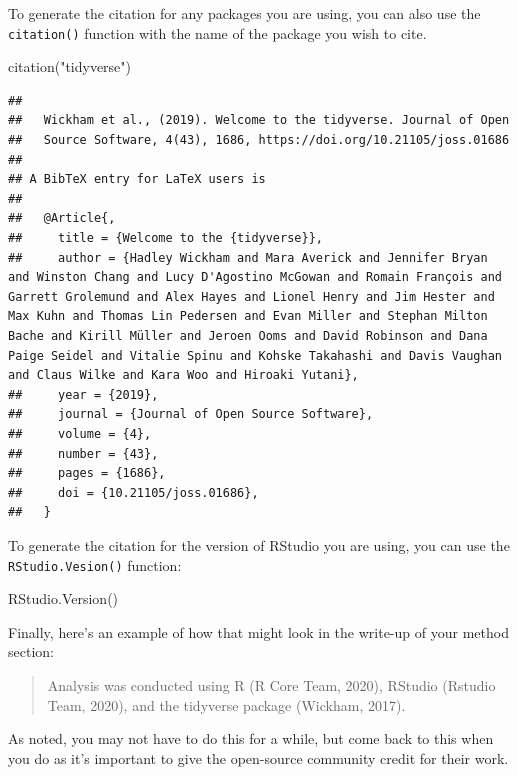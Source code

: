 \documentclass[
  oneside]{book}
\newenvironment{Shaded}{\begin{snugshade}}{\end{snugshade}}
\newcommand{\FunctionTok}[1]{\textcolor[rgb]{0.00,0.00,0.00}{#1}}
\newcommand{\NormalTok}[1]{#1}
\newcommand{\StringTok}[1]{\textcolor[rgb]{0.31,0.60,0.02}{#1}}
\begin{document}
To generate the citation for any packages you are using, you can also use the \texttt{citation()} function with the name of the package you wish to cite.

\begin{Shaded}
\begin{Highlighting}[]
\FunctionTok{citation}\NormalTok{(}\StringTok{"tidyverse"}\NormalTok{)}
\end{Highlighting}
\end{Shaded}

\begin{verbatim}
## 
##   Wickham et al., (2019). Welcome to the tidyverse. Journal of Open
##   Source Software, 4(43), 1686, https://doi.org/10.21105/joss.01686
## 
## A BibTeX entry for LaTeX users is
## 
##   @Article{,
##     title = {Welcome to the {tidyverse}},
##     author = {Hadley Wickham and Mara Averick and Jennifer Bryan and Winston Chang and Lucy D'Agostino McGowan and Romain François and Garrett Grolemund and Alex Hayes and Lionel Henry and Jim Hester and Max Kuhn and Thomas Lin Pedersen and Evan Miller and Stephan Milton Bache and Kirill Müller and Jeroen Ooms and David Robinson and Dana Paige Seidel and Vitalie Spinu and Kohske Takahashi and Davis Vaughan and Claus Wilke and Kara Woo and Hiroaki Yutani},
##     year = {2019},
##     journal = {Journal of Open Source Software},
##     volume = {4},
##     number = {43},
##     pages = {1686},
##     doi = {10.21105/joss.01686},
##   }
\end{verbatim}

To generate the citation for the version of RStudio you are using, you can use the \texttt{RStudio.Vesion()} function:

\begin{Shaded}
\begin{Highlighting}[]
\FunctionTok{RStudio.Version}\NormalTok{()}
\end{Highlighting}
\end{Shaded}

Finally, here's an example of how that might look in the write-up of your method section:

\begin{quote}
Analysis was conducted using R (R Core Team, 2020), RStudio (Rstudio Team, 2020), and the tidyverse package (Wickham, 2017).
\end{quote}

As noted, you may not have to do this for a while, but come back to this when you do as it's important to give the open-source community credit for their work.
\end{document}
